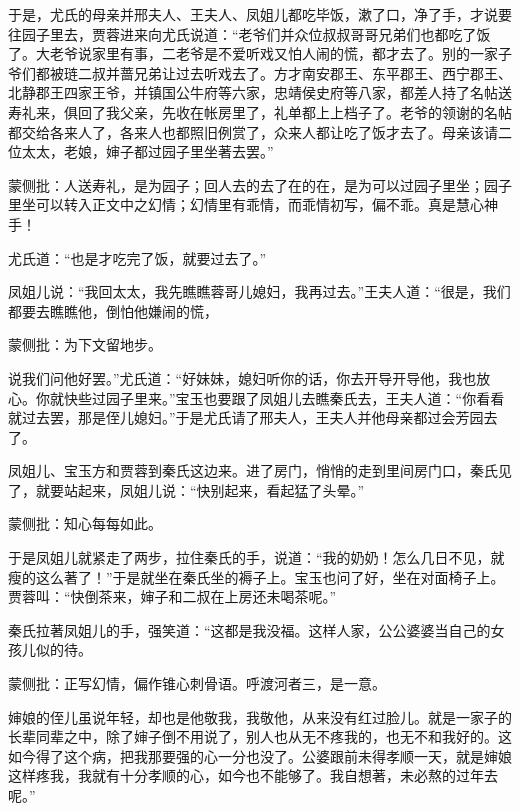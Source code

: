 \begin{parag}
    于是，尤氏的母亲并邢夫人、王夫人、凤姐儿都吃毕饭，漱了口，净了手，才说要往园子里去，贾蓉进来向尤氏说道：“老爷们并众位叔叔哥哥兄弟们也都吃了饭了。大老爷说家里有事，二老爷是不爱听戏又怕人闹的慌，都才去了。别的一家子爷们都被琏二叔并蔷兄弟让过去听戏去了。方才南安郡王、东平郡王、西宁郡王、北静郡王四家王爷，并镇国公牛府等六家，忠靖侯史府等八家，都差人持了名帖送寿礼来，俱回了我父亲，先收在帐房里了，礼单都上上档子了。老爷的领谢的名帖都交给各来人了，各来人也都照旧例赏了，众来人都让吃了饭才去了。母亲该请二位太太，老娘，婶子都过园子里坐著去罢。”\begin{note}蒙侧批：人送寿礼，是为园子；回人去的去了在的在，是为可以过园子里坐；园子里坐可以转入正文中之幻情；幻情里有乖情，而乖情初写，偏不乖。真是慧心神手！\end{note}尤氏道：“也是才吃完了饭，就要过去了。”
\end{parag}


\begin{parag}
    凤姐儿说：“我回太太，我先瞧瞧蓉哥儿媳妇，我再过去。”王夫人道：“很是，我们都要去瞧瞧他，倒怕他嫌闹的慌，\begin{note}蒙侧批：为下文留地步。\end{note}说我们问他好罢。”尤氏道：“好妹妹，媳妇听你的话，你去开导开导他，我也放心。你就快些过园子里来。”宝玉也要跟了凤姐儿去瞧秦氏去，王夫人道：“你看看就过去罢，那是侄儿媳妇。”于是尤氏请了邢夫人，王夫人并他母亲都过会芳园去了。
\end{parag}


\begin{parag}
    凤姐儿、宝玉方和贾蓉到秦氏这边来。进了房门，悄悄的走到里间房门口，秦氏见了，就要站起来，凤姐儿说：“快别起来，看起猛了头晕。”\begin{note}蒙侧批：知心每每如此。\end{note}于是凤姐儿就紧走了两步，拉住秦氏的手，说道：“我的奶奶！怎么几日不见，就瘦的这么著了！”于是就坐在秦氏坐的褥子上。宝玉也问了好，坐在对面椅子上。贾蓉叫：“快倒茶来，婶子和二叔在上房还未喝茶呢。”
\end{parag}


\begin{parag}
    秦氏拉著凤姐儿的手，强笑道：“这都是我没福。这样人家，公公婆婆当自己的女孩儿似的待。\begin{note}蒙侧批：正写幻情，偏作锥心刺骨语。呼渡河者三，是一意。\end{note}婶娘的侄儿虽说年轻，却也是他敬我，我敬他，从来没有红过脸儿。就是一家子的长辈同辈之中，除了婶子倒不用说了，别人也从无不疼我的，也无不和我好的。这如今得了这个病，把我那要强的心一分也没了。公婆跟前未得孝顺一天，就是婶娘这样疼我，我就有十分孝顺的心，如今也不能够了。我自想著，未必熬的过年去呢。”
\end{parag}


